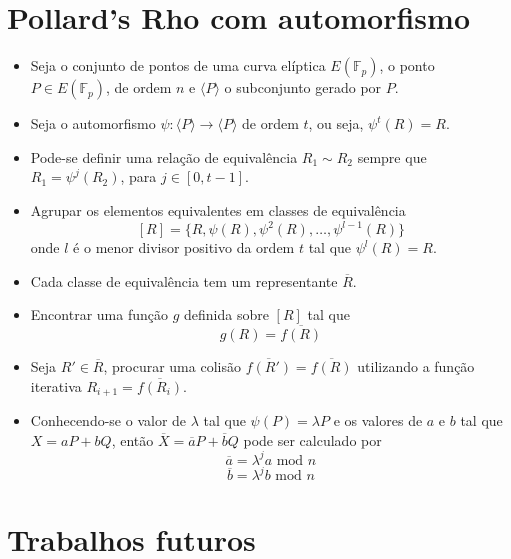 \documentclass{beamer}
\begin{document}
\section{Pollard's Rho com automorfismo}
\begin{frame}
  \begin{itemize}
    \item Seja o conjunto de pontos de uma curva elíptica $E(\mathbb{F}_p)$, o ponto $P \in E(\mathbb{F}_p)$, de ordem $n$ e $\langle P \rangle$ o subconjunto gerado por $P$.
    \item Seja o automorfismo $\psi: \langle P \rangle \to \langle P \rangle$ de ordem $t$, ou seja, $\psi^t(R) = R$.
    \item Pode-se definir uma relação de equivalência $R_1 \sim R_2$ sempre que $R_1 = \psi^j(R_2)$, para $j \in [0, t-1]$.
    \item Agrupar os elementos equivalentes em classes de equivalência
    $$
      [R] = \{R, \psi(R), \psi^2(R), \dots, \psi^{l-1}(R)\}
    $$
    onde $l$ é o menor divisor positivo da ordem $t$ tal que $\psi^l(R) = R$.
    \item Cada classe de equivalência tem um representante $\overline{R}$.
  \end{itemize}
\end{frame}
\begin{frame}
  \begin{itemize}
    \item Encontrar uma função $g$ definida sobre $[R]$ tal que
    $$
      g(R) = \overline{f(R)}
    $$
    \item Seja $R' \in \overline{R}$, procurar uma colisão $\overline{f(R')} = \overline{f(R)}$ utilizando a função iterativa $R_{i+1} = \overline{f(R_i)}$.
    \item Conhecendo-se o valor de $\lambda$ tal que $\psi(P) = \lambda P$ e os valores de $a$ e $b$ tal que $X = aP + bQ$, então $\overline{X} = \overline{a}P + \overline{b}Q$ pode ser calculado por
    $$
      \overline{a} = \lambda^j a \mbox{ mod } n
    $$
    $$
      \overline{b} = \lambda^j b \mbox{ mod } n
    $$
  \end{itemize}
\end{frame}
%
%

\section{Trabalhos futuros}
\begin{frame}

\end{frame}
\end{document}
